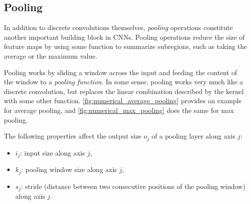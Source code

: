 \subsection{Pooling}\label{sec:pooling}

In addition to discrete convolutions themselves, {\em pooling\/} operations
constitute another important building block in CNNs. Pooling operations reduce
the size of feature maps by using some function to summarize subregions, such
as taking the average or the maximum value.

Pooling works by sliding a window across the input and feeding the content of
the window to a {\em pooling function}. In some sense, pooling works very much
like a discrete convolution, but replaces the linear combination described by
the kernel with some other function. \autoref{fig:numerical_average_pooling}
provides an example for average pooling, and \autoref{fig:numerical_max_pooling}
does the same for max pooling.

The following properties affect the output size $o_j$ of a pooling layer
along axis $j$:

\begin{itemize}
    \item $i_j$: input size along axis $j$,
    \item $k_j$: pooling window size along axis $j$,
    \item $s_j$: stride (distance between two consecutive positions of the
        pooling window) along axis $j$.
\end{itemize}

